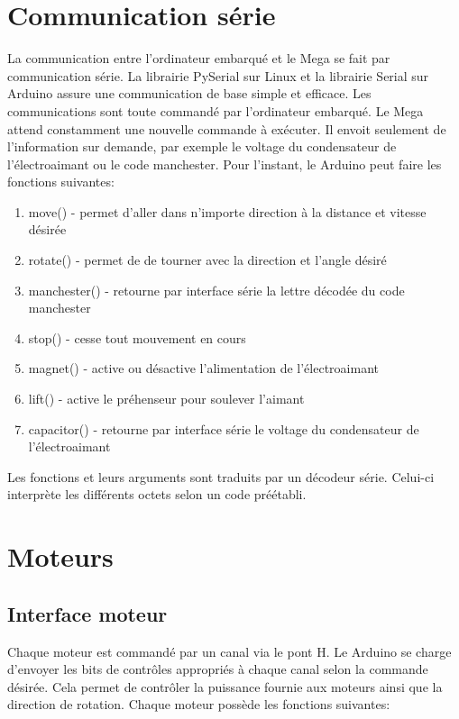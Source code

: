 \section{Communication série}

La communication entre l’ordinateur embarqué et le Mega se fait par communication série. La librairie PySerial sur Linux et la librairie Serial sur Arduino assure une communication de base simple et efficace. Les communications sont toute commandé par l’ordinateur embarqué. Le Mega attend constamment une nouvelle commande à exécuter. Il envoit seulement de l’information sur demande, par exemple le voltage du condensateur de l’électroaimant ou le code manchester. Pour l’instant, le Arduino peut faire les fonctions suivantes:

\begin{enumerate}

\item move() - permet d’aller dans n’importe direction à la distance et vitesse désirée
\item rotate() -  permet de de tourner avec la direction et l’angle désiré
\item manchester() - retourne par interface série la lettre décodée du code manchester
\item stop() - cesse tout mouvement en cours
\item magnet() - active ou désactive l’alimentation de l’électroaimant
\item lift() - active le préhenseur pour soulever l’aimant
\item capacitor() - retourne par interface série le voltage du condensateur de l’électroaimant
\end{enumerate}

Les fonctions et leurs arguments sont traduits par un décodeur série. Celui-ci interprète les différents octets selon un code préétabli.

\section{Moteurs}

\subsection{Interface moteur}

Chaque moteur est commandé par un canal via le pont H. Le Arduino se charge d’envoyer les bits de contrôles appropriés à chaque canal selon la commande désirée. Cela permet de contrôler la puissance fournie aux moteurs ainsi que la direction de rotation. Chaque moteur possède les fonctions suivantes:

